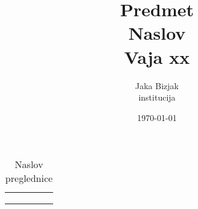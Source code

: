 \documentclass[12pt,a4paper,oneside,fleqn]{article}
\title{\bf{Predmet \\ Naslov \\ Vaja xx}}
\author{Jaka Bizjak\\
institucija}
\date{\today}
\begin{document}
\maketitle


\begin{table}[ht!]
\caption{Naslov preglednice} 
\label{tab:naziv}
\centering
\begin{tabular}{|c||c|c|c|c|}
\hline
& & & &  \\
\hline 
\hline
& & & &  \\
\hline
& & & &  \\
\hline
& & & &  \\
\hline 
\end{tabular}
\end{table}
\cite{ZvarBaskovic2022, Hasan2023, Kamsek2021, DanishEnergyAgency, Tzamalis2011, AgencijaRepublikeSlovenijezaOkolje, Hervas-Zaragoza2022, Hwang2023, RisenEnergyco.Ltd., IEA2015, EuropeanEnvironmentAgency2023, IEA2015_1, IJSCEU2023}




	
\end{document}
